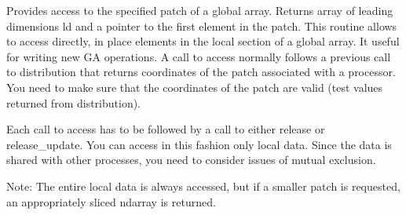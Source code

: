 \documentclass[12pt]{article}
\begin{document}
\begin{pydesc}
Provides access to the specified patch of a global array. Returns array of
leading dimensions ld and a pointer to the first element in the patch.  This
routine allows to access directly, in place elements in the local section of a
global array. It useful for writing new GA operations. A call to access
normally follows a previous call to distribution that returns coordinates of
the patch associated with a processor. You need to make sure that the
coordinates of the patch are valid (test values returned from distribution).

Each call to access has to be followed by a call to either release or
release_update. You can access in this fashion only local data.  Since the
data is shared with other processes, you need to consider issues of mutual
exclusion.

Note: The entire local data is always accessed, but if a smaller patch is
requested, an appropriately sliced ndarray is returned.
\end{pydesc}
\end{document}
